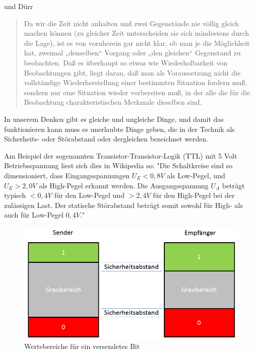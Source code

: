 \documentclass[12pt]{book}
\begin{document}
und Dürr

\begin{quote}\begin{tcolorbox}
Da wir die Zeit nicht anhalten und zwei Gegenstände nie völlig gleich machen können (zu gleicher Zeit unterscheiden sie sich mindestens durch die Lage), ist es von vornherein gar nicht klar, ob man je die Möglichkeit hat, zweimal „denselben“ Vorgang oder „den gleichen“ Gegenstand zu beobachten. Daß es überhaupt so etwas wie Wiederholbarkeit von Beobachtungen gibt, liegt daran, daß man als Voraussetzung nicht die vollständige Wiederherstellung einer bestimmten Situation fordern muß, sondern nur eine Situation wieder vorbereiten muß, in der alle die für die Beobachtung charakteristischen Merkmale dieselben sind.
\end{tcolorbox}\end{quote}

In unserem Denken gibt es gleiche und ungleiche Dinge, und damit das funktionieren kann muss es unerlaubte Dinge geben, die in der Technik als Sicherheits- oder Störabstand oder dergleichen bezeichnet werden.

Am Beispiel der sogenannten Transistor-Transistor-Logik (TTL) mit 5 Volt Betriebsspannung liest sich dies in Wikipedia so:
"Die Schaltkreise sind so dimensioniert, dass Eingangsspannungen $U_E < 0,8 V$ als Low-Pegel, und $U_E > 2,0 V$ als High-Pegel erkannt werden.
Die Ausgangsspannung $U_A$ beträgt typisch $< 0,4 V$ für den Low-Pegel und $> 2,4 V$ für den High-Pegel bei der zulässigen Last.
Der statische Störabstand beträgt somit sowohl für High- als auch für Low-Pegel $0,4 V$."

\begin{figure}[!h]\begin{center}
  \includegraphics[width=13cm]{Bilder/KlassischesBit.png}
  \caption{Wertebereiche für ein versendetes Bit}
  \label{fig:classical_bit}
\end{center}\end{figure}
\end{document}

